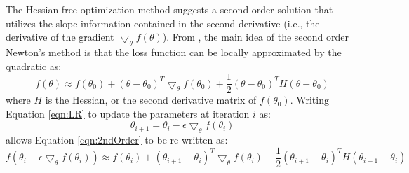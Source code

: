 \documentclass{article}
\begin{document}
The Hessian-free optimization method \citep{martens2010deep} suggests a second order solution that utilizes the slope information contained in the second derivative (i.e., the derivative of the gradient $\bigtriangledown_\theta f(\theta)$).
From \citet{martens2010deep},  the main idea of the second order Newton's method is that the loss function can be locally approximated by the quadratic as:
\begin{equation}
f(\theta) \approx f(\theta_0) + (\theta - \theta_0)^T \bigtriangledown_\theta f(\theta_0) + \frac{1}{2}  (\theta - \theta_0)^T H (\theta - \theta_0)
\label{eqn:2ndOrder}
\end{equation}
where $H$ is the Hessian, or the second derivative matrix of $f(\theta_0)$.
Writing Equation \ref{eqn:LR} to update the parameters at iteration $i$ as: 
\begin{equation}
\theta_{i+1} = \theta_{i} - \epsilon \bigtriangledown_\theta f(\theta_{i})
\label{eqn:theta}
\end{equation}
allows Equation \ref{eqn:2ndOrder} to be re-written as:
\begin{equation}
f(\theta_{i} - \epsilon \bigtriangledown_\theta f(\theta_{i})) \approx f(\theta_{i}) + (\theta_{i+1} - \theta_{i})^T \bigtriangledown_\theta f(\theta_{i}) + \frac{1}{2}  (\theta_{i+1} - \theta_{i})^T H (\theta_{i+1} - \theta_{i})
\end{equation}


\end{document}
